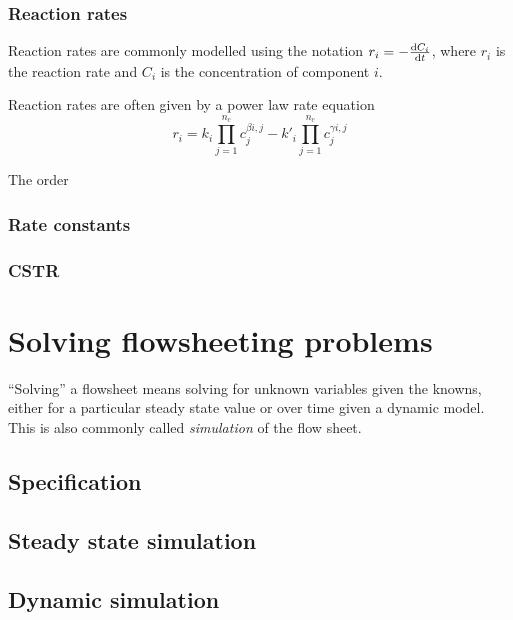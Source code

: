 \subsubsection{Reaction rates}
Reaction rates are commonly modelled using the notation
$r_i=-\frac{\mathrm{d}C_i}{\mathrm{d}t}$, where $r_i$ is the reaction rate and $C_i$ is the
concentration of component $i$.  

Reaction rates are often given by a power law rate equation
\begin{equation}
  r_i = k_i \prod_{j=1}^{n_c}c_j^{\beta{i,j}} - k'_i\prod_{j=1}^{n_c}c_j^{\gamma{i,j}}
\end{equation}

The order 

\subsubsection{Rate constants}

\subsubsection{CSTR}

\section{Solving flowsheeting problems}
``Solving'' a flowsheet means solving for unknown variables given the
knowns, either for a particular steady state value or over time given
a dynamic model.  This is also commonly called \emph{simulation} of the flow sheet.

\subsection{Specification}

\subsection{Steady state simulation}

\subsection{Dynamic simulation}


